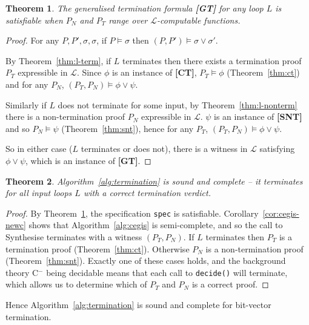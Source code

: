 \documentclass[preprint]{sigplanconf}
\newtheorem{theorem}{Theorem}
\theoremstyle{definition}
\newcommand{\newC}{C$^-$\xspace}
\begin{document}
\begin{theorem}
 \label{thm:generalised-sat}
 The generalised termination formula {\bf [GT]} for any loop $L$ is satisfiable
 when $P_N$ and $P_T$ range over \mbox{$\mathcal{L}$-computable} functions.
\end{theorem}

\begin{proof}
 For any $P, P', \sigma, \sigma$, if $P \models \sigma$ then $(P, P') \models \sigma \vee \sigma'$.

 By Theorem~\ref{thm:l-term}, if $L$ terminates then there exists a termination proof $P_T$ expressible
 in $\mathcal{L}$.  Since $\phi$ is an instance of {\bf [CT]}, $P_T \models \phi$ (Theorem~\ref{thm:ct}) and
 for any $P_N$, $(P_T, P_N) \models \phi \vee \psi$.

 Similarly if $L$ does not terminate for some input, by Theorem~\ref{thm:l-nonterm} there is a non-termination
 proof $P_N$ expressible in $\mathcal{L}$.  $\psi$ is an instance of {\bf [SNT]} and so $P_N \models \psi$
 (Theorem~\ref{thm:snt}), hence for any $P_T$, $(P_T, P_N) \models \phi \vee \psi$.

 So in either case ($L$ terminates or does not), there is a witness in $\mathcal{L}$ satisfying
 $\phi \vee \psi$, which is an instance of {\bf [GT]}.
\end{proof}

\begin{theorem}
 Algorithm~\ref{alg:termination} is sound and complete -- it terminates for all input loops $L$ with
 a correct termination verdict.
\end{theorem}

\begin{proof}
 By Theorem~\ref{thm:generalised-sat}, the specification \lstinline!spec! is satisfiable.  Corollary~\ref{cor:cegis-newc}
 shows that Algorithm~\ref{alg:cegis} is semi-complete, and so the call to {\sc Synthesise} terminates with a witness $(P_T, P_N)$.
 If $L$ terminates then $P_T$ is a termination proof (Theorem~\ref{thm:ct}).  Otherwise $P_N$ is a non-termination proof
 (Theorem~\ref{thm:snt}).  Exactly one of these cases holds, and the background theory \newC being decidable means that each
 call to \lstinline|decide()| will terminate, which allows us to determine which of $P_T$ and $P_N$ is a correct proof.
\end{proof}

Hence Algorithm~\ref{alg:termination} is sound and complete for bit-vector termination.
\end{document}
